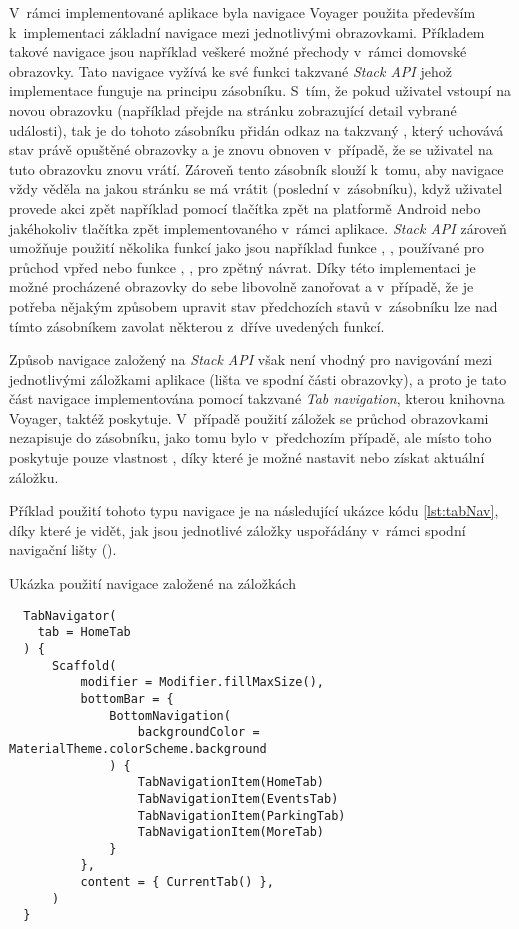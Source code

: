 V~rámci implementované aplikace byla navigace Voyager použita především k~implementaci základní navigace mezi jednotlivými obrazovkami.
Příkladem takové navigace jsou například veškeré možné přechody v~rámci domovské obrazovky. Tato navigace vyžívá ke své funkci takzvané 
\textit{Stack API} jehož implementace funguje na principu zásobníku. S~tím, že pokud uživatel vstoupí na novou obrazovku 
(například přejde na stránku zobrazující detail vybrané události), tak je do tohoto zásobníku přidán odkaz na takzvaný ,
který uchovává stav právě opuštěné obrazovky a je znovu obnoven v~případě, že se uživatel na tuto obrazovku znovu vrátí. Zároveň tento
zásobník slouží k~tomu, aby navigace vždy věděla na jakou stránku se má vrátit (poslední v~zásobníku), když uživatel provede akci zpět
například pomocí tlačítka zpět na platformě Android nebo jakéhokoliv tlačítka zpět implementovaného v~rámci aplikace. \textit{Stack API}
 zároveň umožňuje použití několika funkcí jako jsou například funkce , ,  používané pro průchod vpřed 
 nebo funkce , ,  pro zpětný návrat. 
Díky této implementaci je možné procházené obrazovky do sebe libovolně zanořovat a v~případě, že je potřeba nějakým způsobem upravit
stav předchozích stavů v~zásobníku lze nad tímto zásobníkem zavolat některou z~dříve uvedených funkcí.

\medskip

Způsob navigace založený na \textit{Stack API} však není vhodný pro navigování mezi jednotlivými záložkami aplikace (lišta ve spodní 
části obrazovky), a proto je tato část navigace implementována pomocí takzvané \textit{Tab navigation}, kterou knihovna Voyager, taktéž poskytuje.
V~případě použití záložek se průchod obrazovkami nezapisuje do zásobníku, jako tomu bylo v~předchozím případě, ale místo toho poskytuje pouze vlastnost 
, díky které je možné nastavit nebo získat aktuální záložku. \cite{voyagerTabNav} 

Příklad použití tohoto typu navigace je na následující ukázce kódu \ref{lst:tabNav}, díky které je vidět, jak jsou jednotlivé záložky 
uspořádány v~rámci spodní navigační lišty ().

\begin{listing}[H]
\caption{Ukázka použití navigace založené na záložkách}\label{lst:tabNav}
\begin{verbatim}
  TabNavigator(
    tab = HomeTab
  ) {
      Scaffold(
          modifier = Modifier.fillMaxSize(),
          bottomBar = {
              BottomNavigation(
                  backgroundColor = MaterialTheme.colorScheme.background
              ) {
                  TabNavigationItem(HomeTab)
                  TabNavigationItem(EventsTab)
                  TabNavigationItem(ParkingTab)
                  TabNavigationItem(MoreTab)
              }
          },
          content = { CurrentTab() },
      )
  }
\end{verbatim}
\end{listing}

